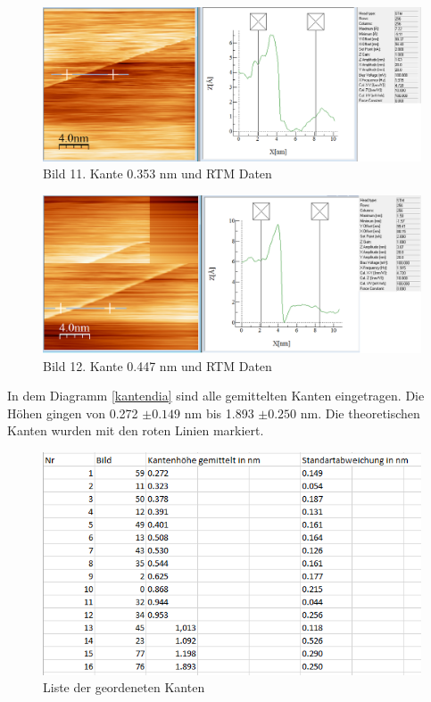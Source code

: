 \documentclass[10pt,a4paper]{article}
\begin{document}
\begin{figure}[]
	\includegraphics[scale = 0.3]{bild11.png}
	\centering
	\caption{Bild 11. Kante 0.353 nm und RTM Daten}
	\label{b11}
\end{figure}
\begin{figure}[]
	\includegraphics[scale = 0.3]{bild12.png}
	\centering
	\caption{Bild 12. Kante 0.447 nm und RTM Daten}
	\label{b12}
\end{figure}




In dem Diagramm \ref{kantendia} sind alle gemittelten Kanten eingetragen. Die Höhen gingen von 0.272  $ \pm 0.149 $ nm bis 1.893 $ \pm 0.250 $ nm. Die theoretischen Kanten wurden mit den roten Linien markiert.

\begin{figure}[]
	\includegraphics[scale = 0.5]{Kantengeordnetrichtig.png}
	\centering
	\caption{Liste der geordeneten Kanten}
	\label{list}
\end{figure}
\end{document}
